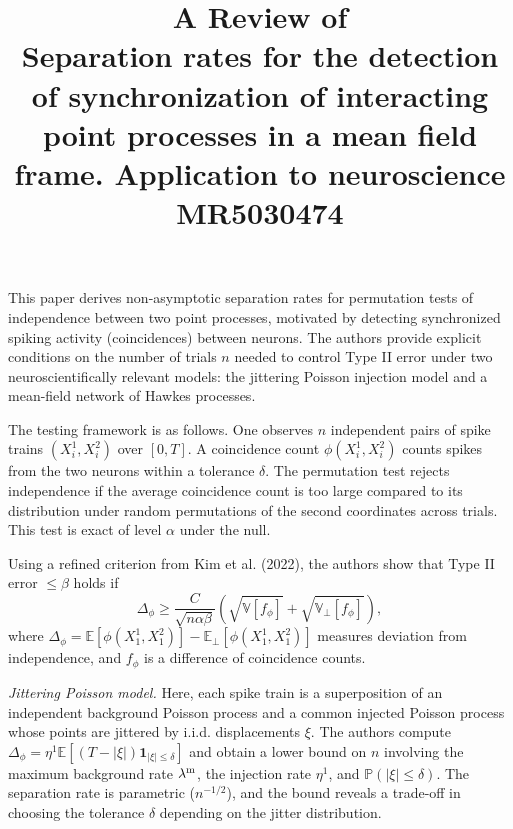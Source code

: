 \documentclass[11pt]{article}
\title{A Review of \\Separation rates for the detection of synchronization of interacting point processes in a mean field frame.
	Application to neuroscience\\ MR5030474}
\begin{document}
	\maketitle	

\noindent This paper derives non-asymptotic separation rates for permutation tests of independence between two point processes, motivated by detecting synchronized spiking activity (coincidences) between neurons. The authors provide explicit conditions on the number of trials $n$ needed to control Type II error under two neuroscientifically relevant models: the jittering Poisson injection model and a mean-field network of Hawkes processes.

The testing framework is as follows. One observes $n$ independent pairs of spike trains $(X_i^1,X_i^2)$ over $[0,T]$. A coincidence count $\phi(X_i^1,X_i^2)$ counts spikes from the two neurons within a tolerance $\delta$. The permutation test rejects independence if the average coincidence count is too large compared to its distribution under random permutations of the second coordinates across trials. This test is exact of level $\alpha$ under the null.

Using a refined criterion from Kim et al. (2022), the authors show that Type II error $\le \beta$ holds if
$$
\Delta_\phi \ge \frac{C}{\sqrt{n\alpha\beta}}\left(\sqrt{\mathbb{V}[f_\phi]} + \sqrt{\mathbb{V}_\perp[f_\phi]}\right),
$$
where $\Delta_\phi = \mathbb{E}[\phi(X_1^1,X_1^2)] - \mathbb{E}_\perp[\phi(X_1^1,X_1^2)]$ measures deviation from independence, and $f_\phi$ is a difference of coincidence counts.

\textit{Jittering Poisson model.} Here, each spike train is a superposition of an independent background Poisson process and a common injected Poisson process whose points are jittered by i.i.d. displacements $\xi$. The authors compute $\Delta_\phi = \eta^1\mathbb{E}[(T-|\xi|)\mathbf{1}_{|\xi|\le\delta}]$ and obtain a lower bound on $n$ involving the maximum background rate $\lambda^{\rm m}$, the injection rate $\eta^1$, and $\mathbb{P}(|\xi|\le\delta)$. The separation rate is parametric ($n^{-1/2}$), and the bound reveals a trade-off in choosing the tolerance $\delta$ depending on the jitter distribution.
\end{document}
